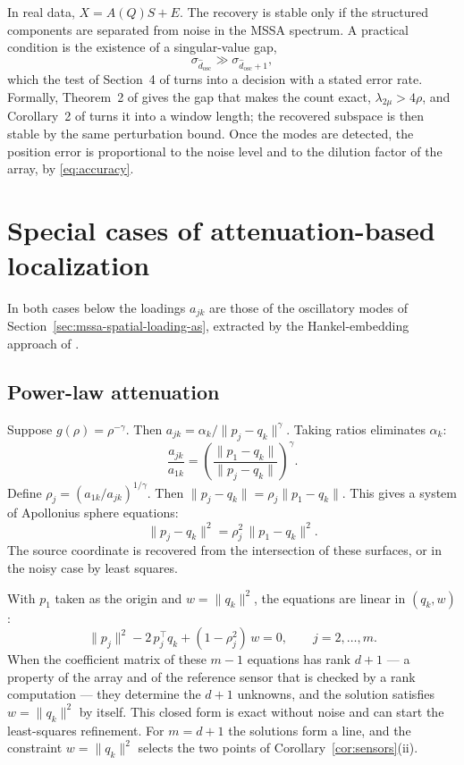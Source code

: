 \documentclass{article}
\begin{document}
In real data, $X = A(Q)S + E$. The recovery is stable only if the structured components are separated from noise in the MSSA spectrum. A practical condition is the existence of a singular-value gap, \[
\sigma_{\widehat{d}_{\mathrm{osc}}} \gg \sigma_{\widehat{d}_{\mathrm{osc}} + 1},
\] which the test of Section~4 of \cite{ref-companionA} turns into a decision with a stated error rate. Formally, Theorem~2 of \cite{ref-companionA} gives the gap that makes the count exact, $\lambda_{2\mu} > 4\rho$, and Corollary~2 of \cite{ref-companionA} turns it into a window length; the recovered subspace is then stable by the same perturbation bound. Once the modes are detected, the position error is proportional to the noise level and to the dilution factor of the array, by \eqref{eq:accuracy}.

\section{Special cases of attenuation-based localization}\label{sec:special-cases-of-attenuation}

In both cases below the loadings $a_{jk}$ are those of the oscillatory modes of Section~\ref{sec:mssa-spatial-loading-as}, extracted by the Hankel-embedding approach of \cite{ref-BernadotteBuchstaber, ref-Bernadotte05, ref-Bernadotte06}.

\subsection{Power-law attenuation}\label{sec:power-law-attenuation}

Suppose $g(\rho) = \rho^{-\gamma}$. Then $a_{jk} = \alpha_k / \lVert p_j - q_k \rVert^{\gamma}$. Taking ratios eliminates $\alpha_k$: \[
\frac{a_{jk}}{a_{1k}} = \left( \frac{\lVert p_1 - q_k \rVert}{\lVert p_j - q_k \rVert} \right)^{\gamma}.
\] Define $\rho_j = (a_{1k} / a_{jk})^{1/\gamma}$. Then $\lVert p_j - q_k \rVert = \rho_j \lVert p_1 - q_k \rVert$. This gives a system of Apollonius sphere equations: \[
\lVert p_j - q_k \rVert^{2} = \rho_j^{2}\, \lVert p_1 - q_k \rVert^{2}.
\] The source coordinate is recovered from the intersection of these surfaces, or in the noisy case by least squares.

With $p_1$ taken as the origin and $w = \lVert q_k \rVert^{2}$, the equations are linear in $(q_k, w)$: \[
\lVert p_j \rVert^{2} - 2\, p_j^{\top} q_k + (1 - \rho_j^{2})\, w = 0, \qquad j = 2, \dots, m .
\] When the coefficient matrix of these $m - 1$ equations has rank $d + 1$ --- a property of the array and of the reference sensor that is checked by a rank computation --- they determine the $d + 1$ unknowns, and the solution satisfies $w = \lVert q_k \rVert^{2}$ by itself. This closed form is exact without noise and can start the least-squares refinement. For $m = d + 1$ the solutions form a line, and the constraint $w = \lVert q_k \rVert^{2}$ selects the two points of Corollary~\ref{cor:sensors}(ii).
\end{document}
